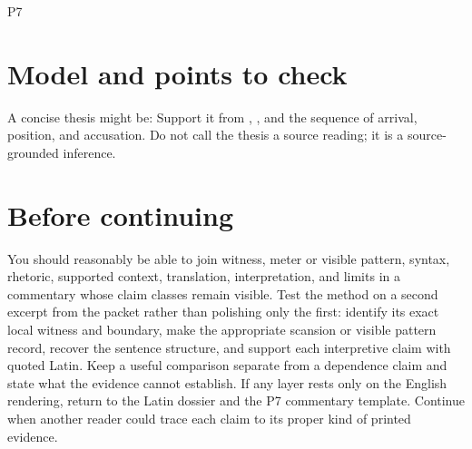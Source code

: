 \begin{courseunit}{P7}
\ifsolutions
\section{Model and points to check}
A concise thesis might be: 
Support it from , , and the sequence of
arrival, position, and accusation. Do not call the thesis a source reading;
it is a source-grounded inference.
\else
\section{Before continuing}
You should reasonably be able to join witness, meter or visible pattern,
syntax, rhetoric, supported context, translation, interpretation, and limits
in a commentary whose claim classes remain visible. Test the method on a
second excerpt from the packet rather than polishing only the first: identify
its exact local witness and boundary, make the appropriate scansion or visible
pattern record, recover the sentence structure, and support each interpretive
claim with quoted Latin. Keep a useful comparison separate from a dependence
claim and state what the evidence cannot establish. If any layer rests only on
the English rendering, return to the Latin dossier and the P7 commentary
template. Continue when another reader could trace each claim to its proper
kind of printed evidence.
\fi
\end{courseunit}

